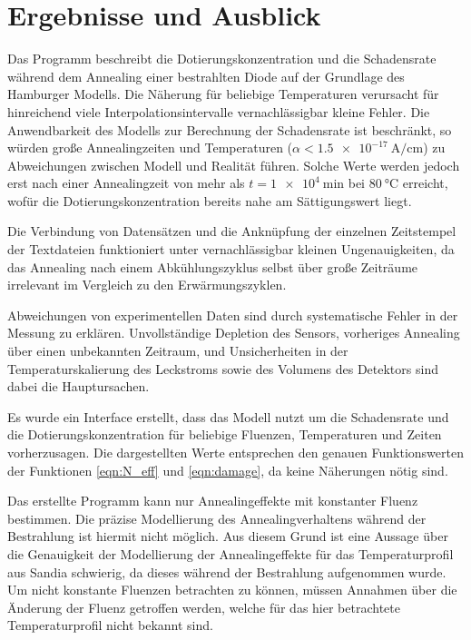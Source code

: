 \chapter{Ergebnisse und Ausblick}
Das Programm beschreibt die Dotierungskonzentration und die Schadensrate während dem
Annealing einer bestrahlten Diode
auf der Grundlage des Hamburger Modells. Die Näherung für beliebige
Temperaturen verursacht für hinreichend viele Interpolationsintervalle
vernachlässigbar kleine Fehler. Die Anwendbarkeit des Modells zur Berechnung der Schadensrate ist
beschränkt, so würden große Annealingzeiten und Temperaturen ($\alpha < \SI{1.5e-17}{\ampere\per\centi\meter}$) zu Abweichungen
zwischen Modell und Realität führen. Solche Werte werden jedoch erst nach
einer Annealingzeit von mehr als $t=\SI{1e4}{\minute}$ bei $\SI{80}{\celsius}$ erreicht, wofür
die Dotierungskonzentration bereits nahe am Sättigungswert liegt.

Die Verbindung von Datensätzen und die Anknüpfung der einzelnen Zeitstempel der
Textdateien funktioniert unter vernachlässigbar kleinen Ungenauigkeiten, da das Annealing
nach einem Abkühlungszyklus selbst über große Zeiträume irrelevant im Vergleich zu
den Erwärmungszyklen.

Abweichungen von experimentellen Daten sind durch systematische Fehler in der Messung
zu erklären. Unvollständige Depletion des Sensors, vorheriges Annealing über einen
unbekannten Zeitraum, und Unsicherheiten in der Temperaturskalierung des Leckstroms sowie
des Volumens des Detektors sind dabei die Hauptursachen.

Es wurde ein Interface erstellt, dass das Modell nutzt um die Schadensrate und die Dotierungskonzentration
für beliebige Fluenzen, Temperaturen und
Zeiten vorherzusagen. Die dargestellten Werte entsprechen den genauen Funktionswerten
der Funktionen \ref{eqn:N_eff} und \ref{eqn:damage}, da keine Näherungen nötig sind.


Das erstellte Programm kann nur Annealingeffekte mit konstanter Fluenz
bestimmen. Die präzise Modellierung des Annealingverhaltens während der Bestrahlung
ist hiermit nicht möglich.
Aus diesem Grund ist eine Aussage über die Genauigkeit der Modellierung der
Annealingeffekte für das Temperaturprofil aus Sandia schwierig, da dieses während der Bestrahlung
aufgenommen wurde.
Um nicht konstante Fluenzen betrachten zu können, müssen Annahmen
über die Änderung der Fluenz getroffen werden, welche für das
hier betrachtete Temperaturprofil nicht bekannt sind.


